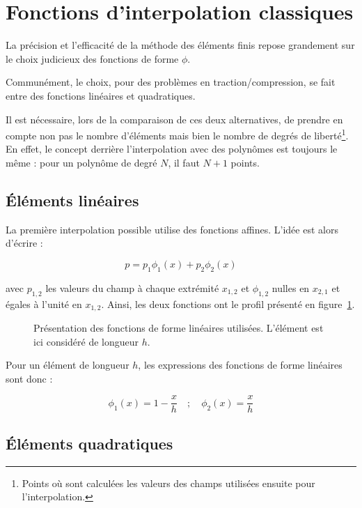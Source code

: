 \section{Fonctions d'interpolation classiques}

La précision et l'efficacité de la méthode des éléments finis repose grandement sur le choix judicieux des fonctions de
forme $\phi$.

Communément, le choix, pour des problèmes en traction/compression, se fait entre des fonctions linéaires et
quadratiques.

Il est nécessaire, lors de la comparaison de ces deux alternatives, de prendre en compte non pas le nombre d'éléments
mais bien le nombre de degrés de liberté\footnote{Points où sont calculées les valeurs des champs utilisées ensuite pour
l'interpolation.}. En effet, le concept derrière l'interpolation avec des polynômes est toujours le même : pour un
polynôme de degré $N$, il faut $N+1$ points.

\subsection{Éléments linéaires}

La première interpolation possible utilise des fonctions affines. L'idée est alors d'écrire :

$$p = p_1\phi_1(x) + p_2\phi_2(x)$$

avec $p_{1,2}$ les valeurs du champ à chaque extrémité $x_{1,2}$ et $\phi_{1,2}$ nulles en $x_{2,1}$ et égales à l'unité
en $x_{1,2}$. Ainsi, les deux fonctions ont le profil présenté en figure~\ref{fig:FEM:lin_shape_fun}.

\begin{figure}[!ht]
	\centering
	
	\caption{\label{fig:FEM:lin_shape_fun}Présentation des fonctions de forme linéaires utilisées. L'élément est ici considéré
	de longueur $h$.}
\end{figure}

\pagebreak

Pour un élément de longueur $h$, les expressions des fonctions de forme linéaires sont donc :

\begin{equation*}
	\phi_1(x) = 1-\frac{x}{h} \quad;\quad \phi_2(x) = \frac{x}{h}
\end{equation*}


\subsection{Éléments quadratiques}

